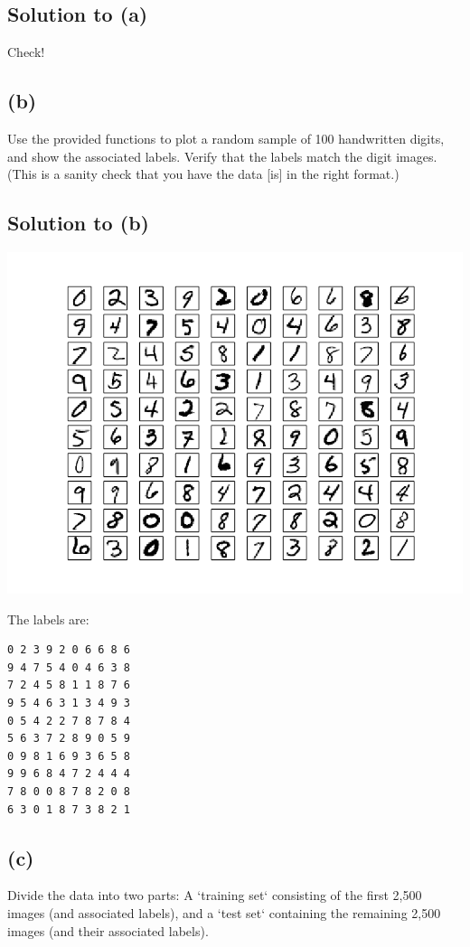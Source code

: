 \documentclass[10pt]{article}
\begin{document}
\subsection*{Solution to (a)} 
Check!

\subsection*{(b)}
\color{blue}
Use the provided functions to plot a random sample of 100 handwritten digits, and show the associated labels. Verify that the labels match the digit images. (This is a sanity check that you have the data [is] in the right format.)
\color{black}

\subsection*{Solution to (b)}
\begin{center}
\includegraphics[scale=0.5]{100TestMnistImages}
\end{center}
The labels are:
\begin{center}
\begin{verbatim}
0 2 3 9 2 0 6 6 8 6 
9 4 7 5 4 0 4 6 3 8 
7 2 4 5 8 1 1 8 7 6 
9 5 4 6 3 1 3 4 9 3 
0 5 4 2 2 7 8 7 8 4 
5 6 3 7 2 8 9 0 5 9 
0 9 8 1 6 9 3 6 5 8 
9 9 6 8 4 7 2 4 4 4 
7 8 0 0 8 7 8 2 0 8 
6 3 0 1 8 7 3 8 2 1
\end{verbatim}
\end{center}

\subsection*{(c)}
\color{blue}
Divide the data into two parts: A `training set` consisting of the first 2,500 images (and associated labels), and a `test set` containing the remaining 2,500 images (and their associated labels).
\color{black}
\end{document}

